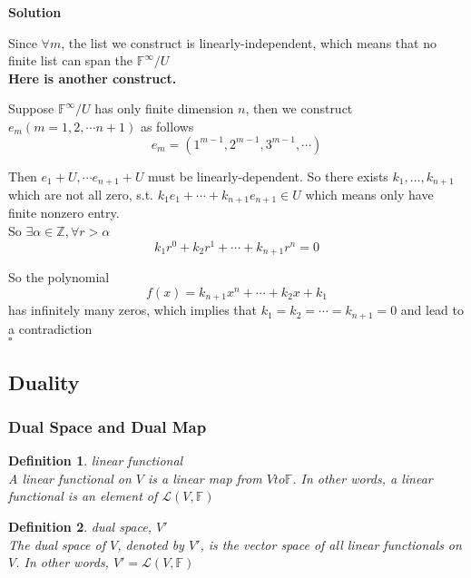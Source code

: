 \documentclass{article}
\newtheorem{definition}{Definition}[subsection]
\newenvironment{solution}{%
{
    \textbf{Solution\\}
    }
}{
  \hfill $\square$ 
  \par\bigskip 
}
\newcommand{\ZZ}{\mathbb{Z}}
\newcommand{\FF}{\mathbb{F}}
\begin{document}
\begin{CJK}{UTF8}{gkai}
\begin{solution}
    Since $\forall m $, the list we construct is linearly-independent, which means that no finite list can span the $\FF^\infty/U$\\

    \textbf{Here is another construct.\\}

    Suppose $\FF^\infty/U$ has only finite dimension $n$, then we construct $e_m(m = 1,2,\cdots n + 1)$ as follows
    \[e_m = (1^{m - 1},2^{m -1},3^{m-1},\cdots)\]

    Then $e_1 + U,\cdots e_{n + 1} + U$ must be linearly-dependent. So there exists $k_1,\ldots , k_{n + 1}$ which are not all zero, s.t. $k_1 e_1 + \cdots + k_{n + 1} e_{n + 1} \in U$ which means only have finite nonzero entry.\\

    So $\exists \alpha \in \ZZ , \forall r > \alpha$
    \[k_1 r^0 + k_2 r^1 + \cdots + k_{n + 1} r^n = 0\]

    So the polynomial
    \[f(x) = k_{n + 1}x^n + \cdots + k_2 x + k_1\]
    has infinitely many zeros, which implies that $k_1 = k_2 = \cdots = k_{n + 1} = 0$ and lead to a contradiction\\

\end{solution}
\subsection{Duality}

\subsubsection{Dual Space and Dual Map}

\begin{definition}
    linear functional\\

    A linear functional on $V$ is a linear map from $V to \FF$. In other words, a linear functional is an element of $\mathcal{L}(V,\FF)$\\
\end{definition}

\begin{definition}
    dual space, $V'$\\

    The dual space of $V$, denoted by $V'$, is the vector space of all linear functionals on $V$. In other words, $V' = \mathcal{L}(V,\FF)$\\
\end{definition}


\end{CJK}
\end{document}
